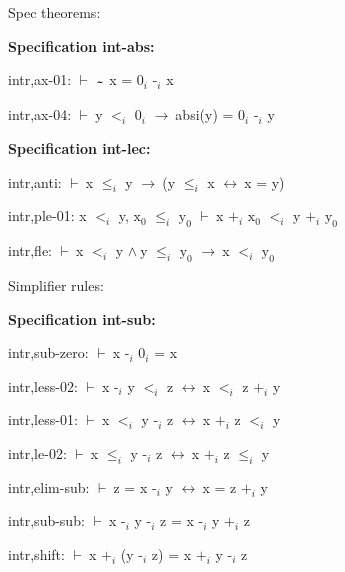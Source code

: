 \documentclass[a4paper]{article}
\newcommand{\tildesym}{\raisebox{-4pt}{\bf\~{}}}
\newcommand{\Fol}{\mbox{$\vdash\ $}}
\newcommand{\And}{\mbox{$\wedge\ $}}
\newcommand{\Imp}{\mbox{$\rightarrow\ $}}
\newcommand{\Equiv}{\mbox{$\leftrightarrow\ $}}
\begin{document}
\raggedright
              
Spec theorems: 


{\bf Specification int-abs:}

intr,ax-01: 
 \Fol $\tildesym$ x = $\mbox{0}_{i}$ $\mbox{-}_{i}$ x



intr,ax-04: 
 \Fol y $\mbox{$<$}_{i}$ $\mbox{0}_{i}$ \Imp absi(y) = $\mbox{0}_{i}$ $\mbox{-}_{i}$ y



{\bf Specification int-lec:}

intr,anti: 
 \Fol x $\mbox{$\le$}_{i}$ y \Imp (y $\mbox{$\le$}_{i}$ x \Equiv x = y)



intr,ple-01: 
x $\mbox{$<$}_{i}$ y, 
$\mbox{x}_{0}$ $\mbox{$\le$}_{i}$ $\mbox{y}_{0}$
 \Fol x $\mbox{+}_{i}$ $\mbox{x}_{0}$ $\mbox{$<$}_{i}$ y $\mbox{+}_{i}$ $\mbox{y}_{0}$



intr,fle: 
 \Fol x $\mbox{$<$}_{i}$ y \And y $\mbox{$\le$}_{i}$ $\mbox{y}_{0}$ \Imp x $\mbox{$<$}_{i}$ $\mbox{y}_{0}$






Simplifier rules: 


{\bf Specification int-sub:}

intr,sub-zero: 
 \Fol x $\mbox{-}_{i}$ $\mbox{0}_{i}$ = x



intr,less-02: 
 \Fol x $\mbox{-}_{i}$ y $\mbox{$<$}_{i}$ z \Equiv x $\mbox{$<$}_{i}$ z $\mbox{+}_{i}$ y



intr,less-01: 
 \Fol x $\mbox{$<$}_{i}$ y $\mbox{-}_{i}$ z \Equiv x $\mbox{+}_{i}$ z $\mbox{$<$}_{i}$ y



intr,le-02: 
 \Fol x $\mbox{$\le$}_{i}$ y $\mbox{-}_{i}$ z \Equiv x $\mbox{+}_{i}$ z $\mbox{$\le$}_{i}$ y



intr,elim-sub: 
 \Fol z = x $\mbox{-}_{i}$ y \Equiv x = z $\mbox{+}_{i}$ y



intr,sub-sub: 
 \Fol x $\mbox{-}_{i}$ y $\mbox{-}_{i}$ z = x $\mbox{-}_{i}$ y $\mbox{+}_{i}$ z



intr,shift: 
 \Fol x $\mbox{+}_{i}$ (y $\mbox{-}_{i}$ z) = x $\mbox{+}_{i}$ y $\mbox{-}_{i}$ z
\end{document}
